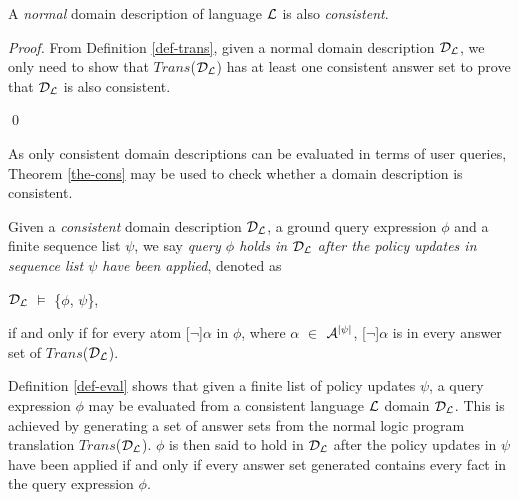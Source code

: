 \documentclass[global,twocolumn,final]{svjour}
\newenvironment{vdefinition}
  {\begin{definition}\hspace{0.25em}}
  {\end{definition}}
\newenvironment{vtheorem}[1]
  {\begin{theorem}[#1]\hspace{0.25em}}
  {\end{theorem}}
\newenvironment{vproof}
  {\begin{proof}\hspace{0.25em}}
  {\qed\end{proof}}
\newenvironment{vquote}
  {\begin{list}{}{\leftmargin 1em}\item[]}
  {\end{list}}
\begin{document}
    \begin{vtheorem}{Domain Consistency}
      \label{the-cons}
      A {\em normal} domain description of language ${\cal L}$ is also
      {\em consistent}.
    \end{vtheorem}

    \begin{vproof}
      From Definition \ref{def-trans}, given a normal domain description
      ${\cal D}_{\cal L}$, we only need to show that
      $Trans$(${\cal D}_{\cal L}$) has at least one consistent answer set to
      prove that ${\cal D}_{\cal L}$ is also consistent.

    \end{vproof}

    As only consistent domain descriptions can be evaluated in terms of user
    queries, Theorem \ref{the-cons} may be used to check whether a domain
    description is consistent.

    \begin{vdefinition}
      \label{def-eval}
      Given a {\em consistent} domain description ${\cal D}_{\cal L}$, a ground
      query expression $\phi$ and a finite sequence list $\psi$, we say
      {\em query $\phi$ holds in ${\cal D}_{\cal L}$ after the policy updates
      in sequence list $\psi$ have been applied}, denoted as

      \begin{vquote}
        ${\cal D}_{\cal L}$ $\models$ \{$\phi$, $\psi$\},
      \end{vquote}

      \noindent if and only if for every atom [$\lnot$]$\alpha$ in $\phi$,
      where $\alpha$ $\in$ ${\cal A}^{|\psi|}$, [$\lnot$]$\alpha$ is in
      every answer set of $Trans$(${\cal D}_{\cal L}$).
    \end{vdefinition}

    Definition \ref{def-eval} shows that given a finite list of policy updates
    $\psi$, a query expression $\phi$ may be evaluated from a consistent
    language ${\cal L}$ domain ${\cal D_{L}}$. This is achieved by generating a
    set of answer sets from the normal logic program translation
    $Trans$(${\cal D_{L}}$). $\phi$ is then said to hold in ${\cal D_{L}}$
    after the policy updates in $\psi$ have been applied if and only if every
    answer set generated contains every fact in the query expression $\phi$.
\end{document}
